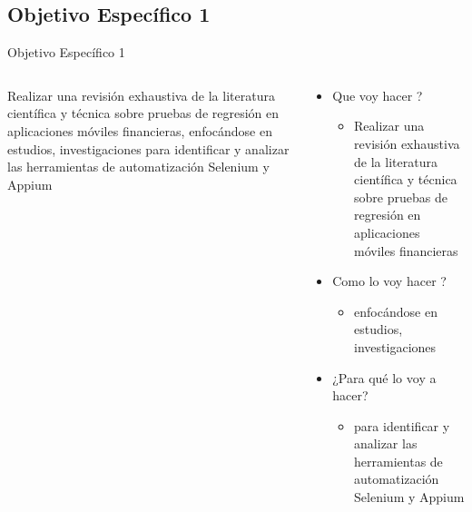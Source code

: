 \documentclass{beamer}
\begin{document}
\subsection{Objetivo Específico 1 }
\begin{frame}{Objetivo Específico 1 }
  \begin{columns}
    \begin{column}{0.5\textwidth}
      Realizar una revisión exhaustiva de la literatura científica y técnica sobre pruebas de regresión en aplicaciones móviles financieras, enfocándose en estudios, investigaciones para identificar y analizar las herramientas de automatización Selenium y Appium
    \end{column}
    \begin{column}{0.55\textwidth}
      \begin{itemize}
          \item Que voy hacer ?
          \begin{itemize}
              \item Realizar una revisión exhaustiva de la literatura científica y técnica sobre pruebas de regresión en aplicaciones móviles financieras
          \end{itemize}
          \item Como lo voy hacer ?
          \begin{itemize}
              \item enfocándose en estudios, investigaciones 
          \end{itemize}
          \item ¿Para qué lo voy a hacer?
          \begin{itemize}
              \item para identificar y analizar las herramientas de automatización  Selenium y Appium 
          \end{itemize}
      \end{itemize}
    \end{column}
  \end{columns}
\end{frame}
\end{document}
